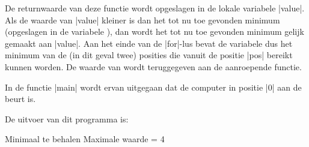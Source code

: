 \begin{cpplstShortInline}
De returnwaarde van deze functie wordt opgeslagen in de lokale variabele |value|.
Als de waarde van |value| kleiner is dan het tot nu toe gevonden minimum (opgeslagen in de variabele ), dan wordt het tot nu toe gevonden minimum gelijk gemaakt aan |value|.
Aan het einde van de |for|\hyp{}lus bevat de variabele  dus het minimum van de (in dit geval twee) posities die vanuit de positie |pos| bereikt kunnen worden.
De waarde van  wordt teruggegeven aan de aanroepende functie.

In de functie |main| wordt ervan uitgegaan dat de computer in positie |0| aan de beurt is.

De uitvoer van dit programma is:
\begin{coutput}
Minimaal te behalen Maximale waarde = 4
\end{coutput}


\end{cpplstShortInline}
